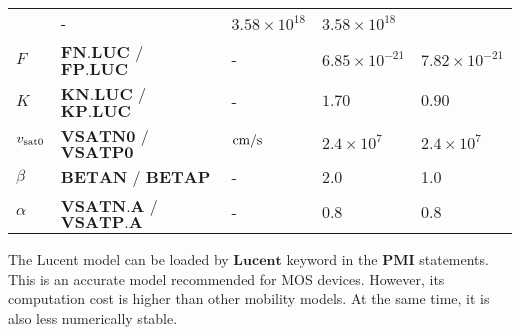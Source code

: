 \documentclass[oneside,12pt]{cgd_book}
\begin{document}
\begin{longtable}{lllll}
& -
& $3.58\times 10^{18}$
& $3.58\times 10^{18}$
\\
 $F$
& $\mathbf{FN.LUC}$ / $\mathbf{FP.LUC}$
& -
& $6.85\times 10^{-21}$
& $7.82\times 10^{-21}$
\\
 $K$
& $\mathbf{KN.LUC}$ / $\mathbf{KP.LUC}$
& -
& $1.70$
& $0.90$
\\
 $v_{\rm sat0}$
& $\mathbf{VSATN0}$ / $\mathbf{VSATP0}$
& $\text{cm}\text{/}\text{s}$
& $2.4\times10^7$
& $2.4\times10^7$
\\
 $\beta$
& $\mathbf{BETAN}$ / $\mathbf{BETAP}$
& -
& 2.0
& 1.0
\\
 $\alpha$
& $\mathbf{VSATN.A}$ / $\mathbf{VSATP.A}$
& -
& 0.8
& 0.8\\
\end{longtable}

The Lucent model can be loaded by $\mathbf{Lucent}$ keyword in the
$\mathbf{PMI}$ statements. This is an accurate model recommended for MOS devices. However, its computation cost is higher
          than other mobility models. At the same time, it is also less numerically stable.
\par
\par
\end{document}
